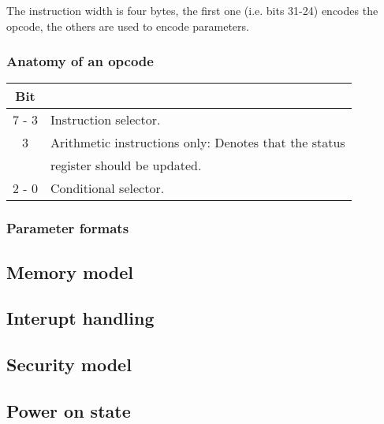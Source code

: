 The instruction width is four bytes, the first one (i.e. bits 31-24)
encodes the opcode, the others are used to encode parameters.

\subsubsection{Anatomy of an opcode}

\begin{center}
  \begin{tabular}{c|l}
    Bit & \\
    \hline
    7 - 3  & Instruction selector. \\
    3      & Arithmetic instructions only: Denotes that the status \\
           & register should be updated. \\
    2 - 0  & Conditional selector. \\
  \end{tabular}
\end{center}

\subsubsection{Parameter formats}

\subsection{Memory model}
\subsection{Interupt handling}
\subsection{Security model}
\subsection{Power on state}
